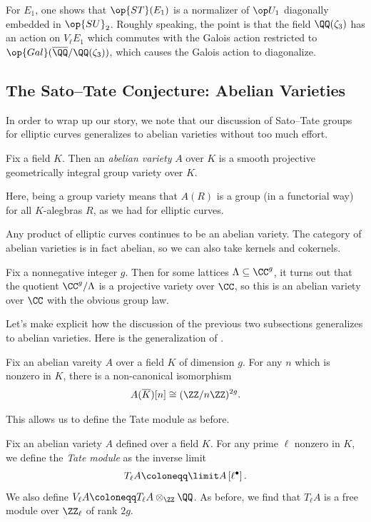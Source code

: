 \documentclass{article}
\begin{document}
\begin{example}
	For $E_1$, one shows that $\op{ST}(E_1)$ is a normalizer of $\op U_1$ diagonally embedded in $\op{SU}_2$. Roughly speaking, the point is that the field $\QQ(\zeta_3)$ has an action on $V_\ell E_1$ which commutes with the Galois action restricted to $\op{Gal}(\overline\QQ/\QQ(\zeta_3))$, which causes the Galois action to diagonalize.
\end{example}

\subsection{The Sato--Tate Conjecture: Abelian Varieties}
In order to wrap up our story, we note that our discussion of Sato--Tate groups for elliptic curves generalizes to abelian varieties without too much effort.
\begin{definition}
	Fix a field $K$. Then an \textit{abelian variety} $A$ over $K$ is a smooth projective geometrically integral group variety over $K$.
\end{definition}
Here, being a group variety means that $A(R)$ is a group (in a functorial way) for all $K$-alegbras $R$, as we had for elliptic curves.
\begin{example}
	Any product of elliptic curves continues to be an abelian variety. The category of abelian varieties is in fact abelian, so we can also take kernels and cokernels.
\end{example}
\begin{example}
	Fix a nonnegative integer $g$. Then for some lattices $\Lambda\subseteq\CC^g$, it turns out that the quotient $\CC^g/\Lambda$ is a projective variety over $\CC$, so this is an abelian variety over $\CC$ with the obvious group law.
\end{example}
Let's make explicit how the discussion of the previous two subsections generalizes to abelian varieties. Here is the generalization of .
\begin{proposition}
	Fix an abelian vareity $A$ over a field $K$ of dimension $g$. For any $n$ which is nonzero in $K$, there is a non-canonical isomorphism
	\[A(\overline K)[n]\cong(\ZZ/n\ZZ)^{2g}.\]
\end{proposition}
This allows us to define the Tate module as before.
\begin{definition}
	Fix an abelian variety $A$ defined over a field $K$. For any prime $\ell$ nonzero in $K$, we define the \textit{Tate module} as the inverse limit
	\[T_\ell A\coloneqq\limit A\left[\ell^\bullet\right].\]
	We also define $V_\ell A\coloneqq T_\ell A\otimes_\ZZ\QQ$. As before, we find that $T_\ell A$ is a free module over $\ZZ_\ell$ of rank $2g$.
\end{definition}
\end{document}
